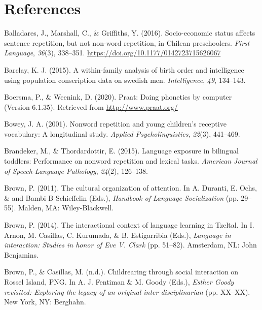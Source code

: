 \documentclass[english,,man,floatsintext]{apa6}
\begin{document}
\hypertarget{references}{%
\section{References}\label{references}}

\setlength{\parindent}{-0.5in}
\setlength{\leftskip}{0.5in}

\hypertarget{refs}{}
\leavevmode\hypertarget{ref-balladares2016socio}{}%
Balladares, J., Marshall, C., \& Griffiths, Y. (2016). Socio-economic status affects sentence repetition, but not non-word repetition, in Chilean preschoolers. \emph{First Language}, \emph{36}(3), 338--351. \url{https://doi.org/10.1177/0142723715626067}

\leavevmode\hypertarget{ref-barclay2015within}{}%
Barclay, K. J. (2015). A within-family analysis of birth order and intelligence using population conscription data on swedish men. \emph{Intelligence}, \emph{49}, 134--143.

\leavevmode\hypertarget{ref-Praat}{}%
Boersma, P., \& Weenink, D. (2020). Praat: Doing phonetics by computer (Version 6.1.35). Retrieved from \url{http://www.praat.org/}

\leavevmode\hypertarget{ref-bowey2001nonword}{}%
Bowey, J. A. (2001). Nonword repetition and young children's receptive vocabulary: A longitudinal study. \emph{Applied Psycholinguistics}, \emph{22}(3), 441--469.

\leavevmode\hypertarget{ref-brandeker2015language}{}%
Brandeker, M., \& Thordardottir, E. (2015). Language exposure in bilingual toddlers: Performance on nonword repetition and lexical tasks. \emph{American Journal of Speech-Language Pathology}, \emph{24}(2), 126--138.

\leavevmode\hypertarget{ref-brown2011cultural}{}%
Brown, P. (2011). The cultural organization of attention. In A. Duranti, E. Ochs, \& and Bambi B Schieffelin (Eds.), \emph{Handbook of Language Socialization} (pp. 29--55). Malden, MA: Wiley-Blackwell.

\leavevmode\hypertarget{ref-brown2014interactional}{}%
Brown, P. (2014). The interactional context of language learning in Tzeltal. In I. Arnon, M. Casillas, C. Kurumada, \& B. Estigarribia (Eds.), \emph{Language in interaction: Studies in honor of Eve V. Clark} (pp. 51--82). Amsterdam, NL: John Benjamins.

\leavevmode\hypertarget{ref-brownIPchildrearing}{}%
Brown, P., \& Casillas, M. (n.d.). Childrearing through social interaction on Rossel Island, PNG. In A. J. Fentiman \& M. Goody (Eds.), \emph{Esther Goody revisited: Exploring the legacy of an original inter-disciplinarian} (pp. XX--XX). New York, NY: Berghahn.
\end{document}
